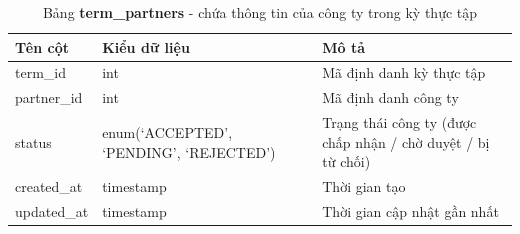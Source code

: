 \documentclass[./../main.tex]{subfiles}
\begin{document}
\begin{table}[H]
	\caption[Bảng term\_partners]{Bảng \textbf{term\_partners} - chứa thông tin của công ty trong kỳ thực tập}
	\label{tab:db_term_partners}
	\begin{tabularx}{\textwidth}{|l|X|X|}
	\hline
	\textbf{Tên cột} & \textbf{Kiểu dữ liệu}                   & \textbf{Mô tả}                                               \\ \hline
	term\_id         & int                                     & Mã định danh kỳ thực tập                                     \\ \hline
	partner\_id      & int                                     & Mã định danh công ty                                         \\ \hline
	status           & enum(‘ACCEPTED', ‘PENDING', ‘REJECTED’) & Trạng thái công ty (được chấp nhận / chờ duyệt / bị từ chối) \\ \hline
	created\_at      & timestamp                               & Thời gian tạo                                                \\ \hline
	updated\_at      & timestamp                               & Thời gian cập nhật gần nhất                                  \\ \hline
	\end{tabularx}
\end{table}
\end{document}

